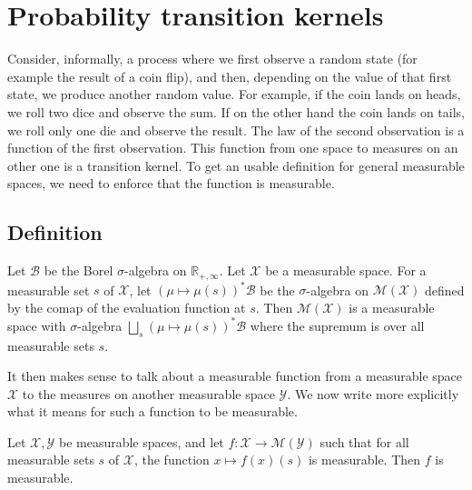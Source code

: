 \chapter{Probability transition kernels}
\label{app:kernels}

Consider, informally, a process where we first observe a random state (for example the result of a coin flip), and then, depending on the value of that first state, we produce another random value.
For example, if the coin lands on heads, we roll two dice and observe the sum. If on the other hand the coin lands on tails, we roll only one die and observe the result.
The law of the second observation is a function of the first observation.
This function from one space to measures on an other one is a transition kernel.
To get an usable definition for general measurable spaces, we need to enforce that the function is measurable.

\section{Definition}

\begin{definition}
  \label{def:measure_measurableSpace}
  \mathlibok
  \uses{}
  Let $\mathcal B$ be the Borel $\sigma$-algebra on $\mathbb{R}_{+,\infty}$. Let $\mathcal X$ be a measurable space.
  For a measurable set $s$ of $\mathcal X$, let $(\mu \mapsto \mu(s))^* \mathcal B$ be the $\sigma$-algebra on $\mathcal M(\mathcal X)$ defined by the comap of the evaluation function at $s$.
  Then $\mathcal M(\mathcal X)$ is a measurable space with $\sigma$-algebra $\bigsqcup_{s} (\mu \mapsto \mu(s))^* \mathcal B$ where the supremum is over all measurable sets $s$.
\end{definition}

It then makes sense to talk about a measurable function from a measurable space $\mathcal X$ to the measures on another measurable space $\mathcal Y$.
We now write more explicitly what it means for such a function to be measurable.

\begin{lemma}
  \label{lem:measurable_measure_fun}
  \mathlibok
  Let $\mathcal X, \mathcal Y$ be measurable spaces, and let $f : \mathcal X \to \mathcal M(\mathcal Y)$ such that for all measurable sets $s$ of $\mathcal X$, the function $x \mapsto f(x)(s)$ is measurable.
  Then $f$ is measurable.
\end{lemma}

